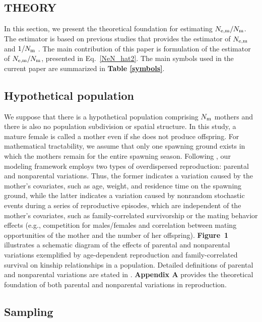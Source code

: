 \documentclass[12pt, English]{article}
\begin{document}
\begin{spacing}{1.9}
\section{THEORY}\label{theory}

In this section, we present the theoretical foundation for estimating $N_{\rm e,m}/N_{\rm m}$. The estimator is based on previous studies that provides the estimator of $N_{\rm e,m}$ \cite[]{Akita_2019} and $1/N_{\rm m}$ \cite[]{Akita2018}. The main contribution of this paper is formulation of the estimator of $N_{\rm e,m}/N_{\rm m}$, presented in Eq.~\ref{NeN_hat2}. The main symbols used in the current paper are summarized in {\bf Table \ref{symbols}}. 
\subsection{Hypothetical population}

We suppose that there is a hypothetical population comprising $N_{\rm m}$ mothers and there is also no population subdivision or spatial structure. In this study, a mature female is called a mother even if she does not produce offspring. For mathematical tractability, we assume that only one spawning ground exists in which the mothers remain for the entire spawning season. Following \cite{Akita_2019}, our modeling framework employs two types of overdispersed reproduction: parental and nonparental variations. Thus, the former indicates a variation caused by the mother's covariates, such as age, weight, and residence time on the spawning ground, while the latter indicates a variation caused by nonrandom stochastic events during a series of reproductive episodes, which are independent of the mother's covariates, such as family-correlated survivorship or the mating behavior effects (e.g., competition for males/females and correlation between mating opportunities of the mother and the number of her offspring). {\bf Figure~1} illustrates a schematic diagram of the effects of parental and nonparental variations exemplified by age-dependent reproduction and family-correlated survival on kinship relationships in a population. Detailed definitions of parental and nonparental variations are stated in \cite{Akita_2019}. {\bf Appendix A} provides the theoretical foundation of both parental and nonparental variations in reproduction.  
\subsection{Sampling}


\end{spacing}
\end{document}
